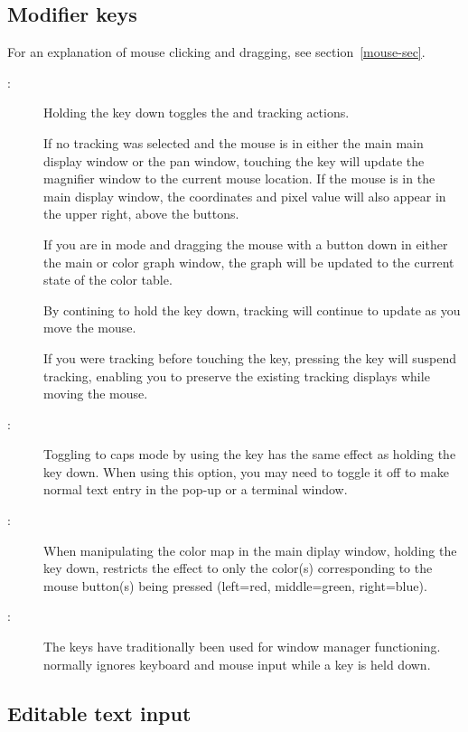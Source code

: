 \subsection{ Modifier keys }

For an explanation of mouse clicking and dragging, see section~\ref{mouse-sec}.
\begin{description}
\item[:]
	Holding the  key down toggles the  and 
	tracking actions.

	      If no tracking was selected and the mouse is in either the
	  main main display window or the pan window, touching the 
	  key will update the magnifier window to the current mouse
	  location.  If the mouse is in the main display window, the
	  coordinates and pixel value will also appear in the upper
	  right, above the buttons.

	      If you are in  mode and dragging the mouse with a
	  button down in either the main or color graph window, the
	  graph will be updated to the current state of the color table.

	      By contining to hold the  key down, tracking will
	  continue to update as you move the mouse.

	      If you were tracking before touching the  key,
	  pressing the  key will suspend tracking, enabling you to
	  preserve the existing tracking displays while moving the mouse.

\item[:]
	Toggling to caps mode by using the  key has
	the same effect as holding the  key down.  When using this
	option, you may need to toggle it off to make normal text entry
	in the pop-up or a terminal window.

\item[:]
	When manipulating the color map in the main diplay window,
	holding the  key down, restricts the effect to only the
	color(s) corresponding to the mouse button(s) being pressed
	(left=red, middle=green, right=blue).

\item[:]
	The  keys have traditionally been used for window manager
	functioning.  {\SAO} normally ignores keyboard and mouse
	input while a  key is held down.
\end{description}

\subsection{ Editable text input }

